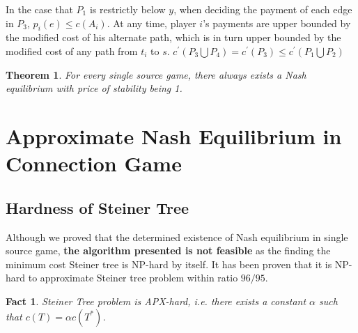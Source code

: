 \documentclass[11pt,psfig,times]{article}
\newtheorem{theorem}{Theorem}[section]
\newtheorem{fact}{Fact}
\begin{document}
In the case that $P_1$ is restrictly below $y$,
when deciding the payment of each edge in $P_3$, $p_i(e) \leq c(A_i)$. At any time, player $i$'s payments are upper bounded by the modified cost of his alternate path, which is in turn upper bounded by the modified cost of any path from $t_i$ to $s$. 
			 $ c^{'}(P_3\bigcup P_4) = c^{'}(P_3) \leq c^{'}(P_1\bigcup P_2)$
	
	
		\begin{theorem}
			For every single source game, there always exists a Nash equilibrium with price of stability being 1.
		\end{theorem}
	
	
\section{Approximate Nash Equilibrium in Connection Game}
	\subsection{Hardness of Steiner Tree}
	Although we proved that the determined existence of Nash equilibrium in single source game, \textbf{the algorithm presented is not feasible} as the finding the minimum cost Steiner tree is NP-hard by itself. It has been proven that it is NP-hard to approximate Steiner tree problem within ratio \(96/95\). 
		
		\begin{fact}
			Steiner Tree problem is APX-hard, i.e. there exists a constant $\alpha$ such that $c(T) = \alpha c(T^*)$.
		\end{fact}
		
\end{document}
